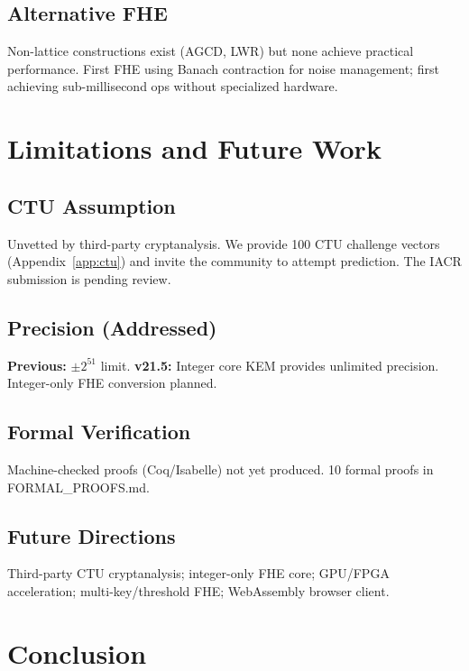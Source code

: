 \documentclass[11pt,a4paper]{article}
\begin{document}
\subsection{Alternative FHE}

Non-lattice constructions exist (AGCD, LWR) but none achieve practical performance. First FHE using Banach contraction for noise management; first achieving sub-millisecond ops without specialized hardware.

\section{Limitations and Future Work}

\subsection{CTU Assumption}
Unvetted by third-party cryptanalysis. We provide 100 CTU challenge vectors (Appendix~\ref{app:ctu}) and invite the community to attempt prediction. The IACR submission is pending review.

\subsection{Precision (Addressed)}
\textbf{Previous:} $\pm 2^{51}$ limit. \textbf{v21.5:} Integer core KEM provides unlimited precision. Integer-only FHE conversion planned.

\subsection{Formal Verification}
Machine-checked proofs (Coq/Isabelle) not yet produced. 10 formal proofs in FORMAL\_PROOFS.md.

\subsection{Future Directions}
Third-party CTU cryptanalysis; integer-only FHE core; GPU/FPGA acceleration; multi-key/threshold FHE; WebAssembly browser client.

\section{Conclusion}
\end{document}
